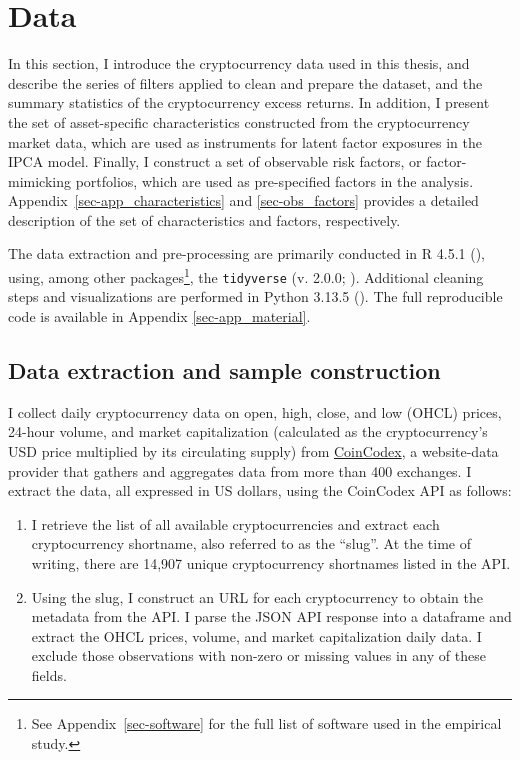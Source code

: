 \documentclass[
  12pt,
  a4paper,
  openany]{scrbook}
\begin{document}

\chapter{Data}\label{sec-data}

In this section, I introduce the cryptocurrency data used in this
thesis, and describe the series of filters applied to clean and prepare
the dataset, and the summary statistics of the cryptocurrency excess
returns. In addition, I present the set of asset-specific
characteristics constructed from the cryptocurrency market data, which
are used as instruments for latent factor exposures in the IPCA model.
Finally, I construct a set of observable risk factors, or
factor-mimicking portfolios, which are used as pre-specified factors in
the analysis. Appendix~\ref{sec-app_characteristics} and
\ref{sec-obs_factors} provides a detailed description of the set of
characteristics and factors, respectively.

The data extraction and pre-processing are primarily conducted in R
4.5.1 (), using, among other
packages\footnote{See Appendix~\ref{sec-software} for the full list of
  software used in the empirical study.}, the \texttt{tidyverse} (v.
2.0.0; ). Additional
cleaning steps and visualizations are performed in Python 3.13.5
(). The full
reproducible code is available in Appendix \ref{sec-app_material}.

\section{Data extraction and sample
construction}\label{data-extraction-and-sample-construction}

I collect daily cryptocurrency data on open, high, close, and low (OHCL)
prices, 24-hour volume, and market capitalization (calculated as the
cryptocurrency's USD price multiplied by its circulating supply) from
\href{https://coincodex.com/}{CoinCodex}, a website-data provider that
gathers and aggregates data from more than 400 exchanges. I extract the
data, all expressed in US dollars, using the CoinCodex API as follows:

\begin{enumerate}
\def\labelenumi{\arabic{enumi}.}
\item
  I retrieve the list of all available cryptocurrencies and extract each
  cryptocurrency shortname, also referred to as the ``slug''. At the
  time of writing, there are 14,907 unique cryptocurrency shortnames
  listed in the API.
\item
  Using the slug, I construct an URL for each cryptocurrency to obtain
  the metadata from the API. I parse the JSON API response into a
  dataframe and extract the OHCL prices, volume, and market
  capitalization daily data. I exclude those observations with non-zero
  or missing values in any of these fields.
\end{enumerate}
\end{document}
